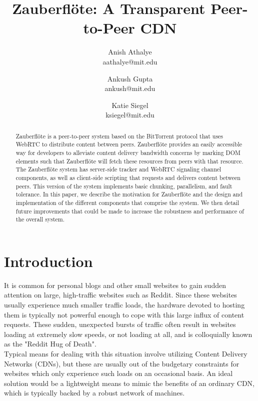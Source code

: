 \documentclass[letterpaper,twocolumn,10pt]{article}
\newcommand{\zbf}{Zauberfl\"{o}te\xspace}
\newcommand{\projtitle}{\zbf: A Transparent Peer-to-Peer CDN}
\begin{document}
\title{\Large \bf \projtitle}

\author{
    {\rm Anish Athalye}\\
    aathalye@mit.edu
    \and
    {\rm Ankush Gupta}\\
    ankush@mit.edu
    \and
    {\rm Katie Siegel}\\
    ksiegel@mit.edu
}

\maketitle
\thispagestyle{empty}

\begin{abstract}
\zbf is a peer-to-peer system based on the BitTorrent protocol that uses WebRTC
to distribute content between peers. \zbf provides an easily accessible way for
developers to alleviate content delivery bandwidth concerns by marking DOM elements
such that \zbf will fetch these resources from peers with that resource. The \zbf
system has server-side tracker and WebRTC signaling channel components, as well
as client-side scripting that requests and delivers content between peers.
This version of the system implements basic chunking, parallelism, and fault tolerance.
In this paper, we describe the motivation for \zbf and the design and implementation of the
different components that comprise the system. We then detail future improvements
that could be made to increase the robustness and performance of the overall system.
\end{abstract}

\section{Introduction}
It is common for personal blogs and other small websites to gain sudden attention
on large, high-traffic websites such as Reddit. Since these websites usually
experience much smaller traffic loads, the hardware devoted to hosting them
is typically not powerful enough to cope with this large influx of content requests.
These sudden, unexpected bursts of traffic often result in websites loading at
extremely slow speeds, or not loading at all, and is colloquially known as the
"Reddit Hug of Death". \\

Typical means for dealing with this situation involve utilizing Content Delivery
Networks (CDNs), but these are usually out of the budgetary constraints for
websites which only experience such loads on an occasional basis. An ideal
solution would be a lightweight means to mimic the benefits of an ordinary
CDN, which is typically backed by a robust network of machines. \\
\end{document}
